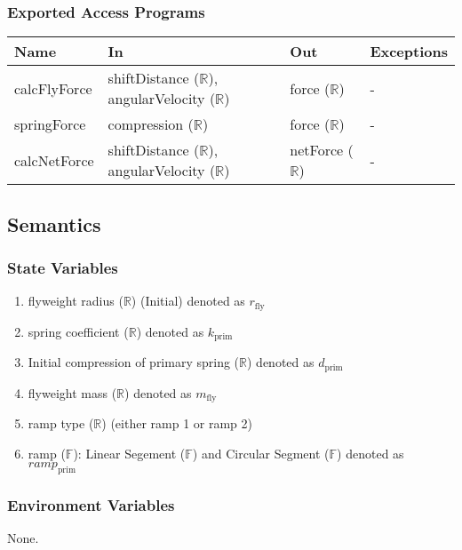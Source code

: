 \documentclass[12pt, titlepage]{article}
\begin{document}
\subsubsection{Exported Access Programs}

\begin{center}
\begin{tabular}{p{2.5cm} p{4cm} p{4cm} p{2cm}}
\hline
\textbf{Name} & \textbf{In} & \textbf{Out} & \textbf{Exceptions} \\
\hline
calcFlyForce & shiftDistance ($\mathbb{R}$), angularVelocity ($\mathbb{R}$) & force ($\mathbb{R}$) & - \\
springForce & compression ($\mathbb{R}$) & force ($\mathbb{R}$) & - \\
calcNetForce & shiftDistance ($\mathbb{R}$), angularVelocity ($\mathbb{R}$) & netForce ($\mathbb{R}$) & - \\
\hline
\end{tabular}
\end{center}

\subsection{Semantics}

\subsubsection{State Variables}

\begin{enumerate}
  \item flyweight radius ($\mathbb{R}$) (Initial) denoted as $r_{\text{fly}}$
  \item spring coefficient ($\mathbb{R}$) denoted as $k_{\text{prim}}$
  \item Initial compression of primary spring ($\mathbb{R}$) denoted as $d_{\text{prim}}$
  \item flyweight mass ($\mathbb{R}$) denoted as $m_\text{fly}$
  \item ramp type ($\mathbb{R}$) (either ramp 1 or ramp 2)
  \item ramp ($\mathbb{F}$): Linear Segement ($\mathbb{F}$) and Circular Segment ($\mathbb{F}$) denoted as $ramp_\text{prim}$
\end{enumerate}

\subsubsection{Environment Variables}
None.
\end{document}
